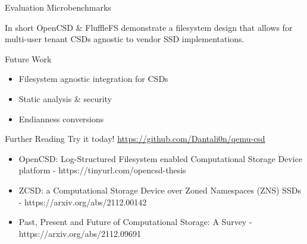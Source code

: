 \documentclass{beamer}
\begin{document}
\begin{frame}{Evaluation Microbenchmarks}
	\begingroup
	\endgroup
\end{frame}


\begin{frame}{In short}
	\begingroup
	\small OpenCSD \& FluffleFS demonstrate a filesystem design that allows for
	multi-user tenant CSDs agnostic to vendor SSD implementations.
	\endgroup
\end{frame}

\begin{frame}{Future Work}
	\begingroup
	\small
	\begin{itemize}
		\item Filesystem agnostic integration for CSDs
		\item Static analysis \& security
		\item Endianness conversions
	\end{itemize}
	\endgroup
\end{frame}

\begin{frame}{Further Reading}
	\begingroup
	\small Try it today! \underline{\url{https://github.com/Dantali0n/qemu-csd}}
	\begin{itemize}
		\item OpenCSD: Log-Structured Filesystem enabled Computational
		Storage Device platform - https://tinyurl.com/opencsd-thesis
		\item ZCSD: a Computational Storage Device over Zoned Namespaces (ZNS)
			SSDs - https://arxiv.org/abs/2112.00142
		\item Past, Present and Future of Computational Storage: A Survey
			- https://arxiv.org/abs/2112.09691
	\end{itemize}
	\endgroup
\end{frame}
\end{document}
